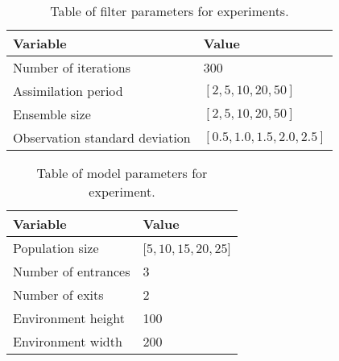 \begin{table}[h]
    \centering
    \begin{tabular}{@{}ll@{}}
        \toprule
        Variable                       & Value                         \\ \midrule
        Number of iterations           & 300                           \\
        Assimilation period            & $[2, 5, 10, 20, 50]$          \\
        Ensemble size                  & $[2, 5, 10, 20, 50]$          \\
        Observation standard deviation & $[0.5, 1.0, 1.5, 2.0, 2.5]$   \\ \bottomrule
    \end{tabular}
    \caption{Table of filter parameters for experiments.}\label{tab:filter_params}
\end{table}

\begin{table}[h]
    \centering
    \begin{tabular}{@{}ll@{}}
    \toprule
        Variable            & Value                 \\ \midrule
        Population size     & $[5, 10, 15, 20, 25$] \\
        Number of entrances & 3                     \\
        Number of exits     & 2                     \\
        Environment height  & 100                   \\
        Environment width   & 200                   \\ \bottomrule
    \end{tabular}
    \caption{Table of model parameters for experiment.}\label{tab:model_params}
\end{table}



